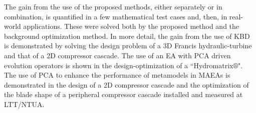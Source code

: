 \begin{abstractslong}
The gain from the use of the proposed methods, either separately or in combination, is quantified in a few mathematical test cases and, then, in real-world applications. These were solved both by the proposed method and the background optimization method. In more detail, the gain from the use of KBD is demonstrated by solving the design problem of a 3D Francis hydraulic-turbine  and that of a 2D compressor cascade. The use of an EA with PCA driven evolution operators is shown in the design-optimization of a ``Hydromatrix$\circledR$". The use of PCA to enhance the performance of metamodels in MAEAs is demonstrated in the design of a 2D compressor cascade and the optimization of the blade shape of a peripheral compressor cascade installed and measured at LTT/NTUA. 

\end{abstractslong}

